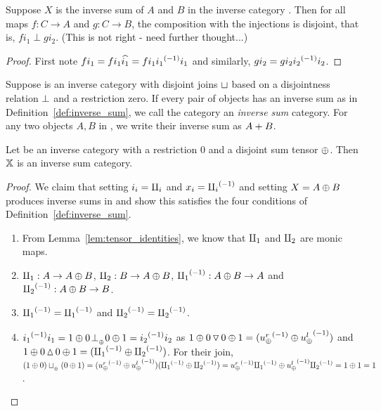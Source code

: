 \begin{lemma}\label{lem:all_maps_to_inverse_sum_are_disjoint}
  Suppose $X$ is the inverse sum of $A$ and $B$ in the inverse category \X. Then for all maps
  $f:C \to A$ and $g: C \to B$, the composition with the injections is disjoint, that is,
  $f i_1 \perp g i_2$. (This is not right - need further thought...)
\end{lemma}
\begin{proof}
  First note $f i_1 = f i_1 \widehat{i_1} = f i_1 {i_1}^{(-1)} i_1$ and similarly, $g i_2 = g i_2
  {i_2}^{(-1)} i_2$.
\end{proof}

\begin{definition}\label{def:inverse_sum_category}
  Suppose \X is an inverse category with disjoint joins $\sqcup$ based on a disjointness
  relation $\perp$ and a restriction zero. If every pair of objects has an inverse sum as in
  Definition~\ref{def:inverse_sum}, we call the category an \emph{inverse sum} category. For any
  two objects $A,B$ in \X, we write their inverse sum as ${{A}+{B}}$.
\end{definition}

\begin{lemma}\label{lem:tensor_disjoint_sum_cats_are_inverse_sum_categories}
  Let \X be an inverse category with a restriction 0 and a disjoint sum tensor $\oplus$. Then $\mathbb{X}$ is
  an inverse sum category.
\end{lemma}
\begin{proof}
  We claim that setting $i_i = \amalg_{i}$ and $x_i = {\amalg_{i}}^{(-1)}$ and setting $X = A\oplus B$ produces inverse
  sums in \X and show this satisfies the four conditions of Definition~\ref{def:inverse_sum}.
  \begin{enumerate}[{(}i{)}]
    \item From Lemma~\ref{lem:tensor_identities}, we know that $\amalg_{1}$ and $\amalg_{2}$ are monic maps.
    \item $\amalg_{1} : A \to A\oplus B$, $\amalg_{2}: B \to A\oplus B$, ${\amalg_{1}}^{(-1)}: A\oplus B \to A$ and ${\amalg_{2}}^{(-1)}: A\oplus B \to B$.
    \item ${\amalg_{1}}^{(-1)} = {\amalg_{1}}^{(-1)}$ and ${\amalg_{2}}^{(-1)} = {\amalg_{2}}^{(-1)}$.
    \item ${i_1}^{(-1)}i_1 = 1\oplus 0 {}_{{}_{}}{\perp_{{}_{\oplus}}} 0\oplus1 = {i_2}^{(-1)}i_2$ as
      $1\oplus0 \operatorname{\triangledown} 0\oplus1 = ({u_{\oplus}^r}^{(-1)}\oplus{\ensuremath{u_{\oplus}^l}}^{(-1)})$ and
      $1\oplus0 \operatorname{\vartriangle} 0\oplus1 = ({\amalg_{1}}^{(-1)}\oplus{\amalg_{2}}^{(-1)})$. For their join,
      $(1\oplus0)\sqcup_{{_{\oplus}}} (0\oplus1) = ({u_{\oplus}^r}^{(-1)}\oplus{\ensuremath{u_{\oplus}^l}}^{(-1)})({\amalg_{1}}^{(-1)}\oplus{\amalg_{2}}^{(-1)}) =
      {u_{\oplus}^r}^{(-1)}{\amalg_{1}}^{(-1)} \oplus {\ensuremath{u_{\oplus}^l}}^{(-1)}{\amalg_{2}}^{(-1)} = 1\oplus1 = 1$.
  \end{enumerate}
\end{proof}

